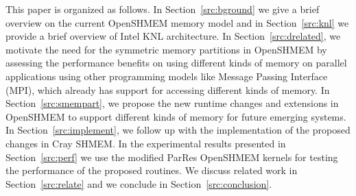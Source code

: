 This paper is organized as follows. In Section~\ref{src:bground} we give a
brief overview on the current OpenSHMEM memory model and in
Section~\ref{src:knl} we provide a brief overview of Intel KNL architecture.
In Section~\ref{src:drelated}, we motivate the need for the symmetric memory
partitions in OpenSHMEM by assessing the performance benefits on using
different kinds of memory on parallel applications using other programming
models like Message Passing Interface~\cite{mpi} (MPI), which already has
support for accessing different kinds of memory. In Section~\ref{src:smempart},
we propose the new runtime changes and extensions in OpenSHMEM to support
different kinds of memory for future emerging systems. In
Section~\ref{src:implement}, we follow up with the implementation of the
proposed changes in Cray SHMEM. In the experimental results presented in
Section~\ref{src:perf} we use the modified ParRes OpenSHMEM kernels for
testing the performance of the proposed routines. We discuss related work
in Section~\ref{src:relate} and we conclude in Section~\ref{src:conclusion}.
